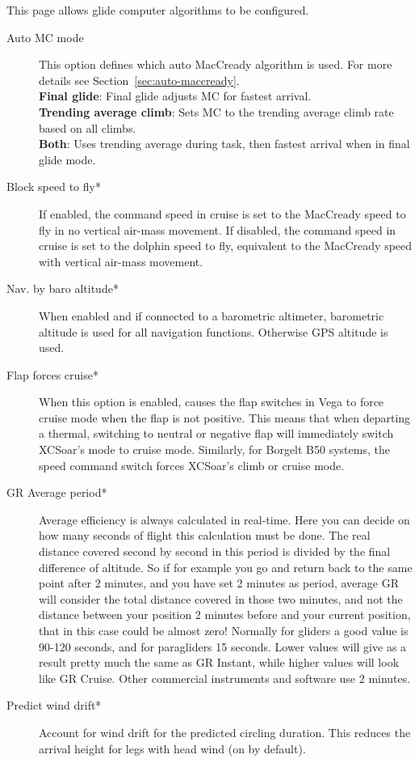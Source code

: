 This page allows glide computer algorithms to be configured.

\begin{description}
\item[Auto MC mode]  This option defines which auto MacCready algorithm is used.
  For more details see Section~\ref{sec:auto-maccready}. \\
  {\bf Final glide}: Final glide adjusts MC for fastest arrival.
 \\
  {\bf Trending average climb}: Sets MC to the trending average climb rate based 
  on all climbs. \\
  {\bf Both}: Uses trending average during task, then fastest arrival when in final 
  glide mode.
\item[Block speed to fly*]  If enabled, the command speed in cruise
  is set to the MacCready speed to fly in no vertical air-mass movement.
  If disabled, the command speed in cruise is set to the dolphin speed to fly,
  equivalent to the MacCready speed with vertical air-mass movement.
\item[Nav. by baro altitude*]  When enabled and if connected to a barometric
  altimeter, barometric altitude is used for all navigation functions. Otherwise
  GPS altitude is used.
\item[Flap forces cruise*]
  When this option is enabled, causes the flap switches in Vega to
  force cruise mode when the flap is not positive. This means that
  when departing a thermal, switching to neutral or negative flap will
  immediately switch XCSoar's mode to cruise mode.
  Similarly, for Borgelt B50 systems, the speed command switch forces
  XCSoar's climb or cruise mode.
\item[GR Average period*]  Average efficiency is always calculated in real-time. 
  Here you can decide on how many seconds of flight this calculation must be done. 
  The real distance covered second by second in this period is divided by the final 
  difference of altitude.  So if for example you go and return back to the same point 
  after 2 minutes, and you have set 2 minutes as period, average GR will consider the 
  total distance covered in those two minutes, and not the distance between your 
  position 2 minutes before and your current position, that in this case could be 
  almost zero! Normally for gliders a good value is 90-120 seconds, and for paragliders 
  15 seconds. Lower values will give as a result pretty much the same as GR Instant, 
  while higher values will look like GR Cruise. Other commercial instruments and 
  software use 2 minutes.
\item[Predict wind drift*]  \label{conf:predict-drift}Account for wind drift for the predicted circling 
  duration. This reduces the arrival height for legs with head wind (on by default).
\end{description}


